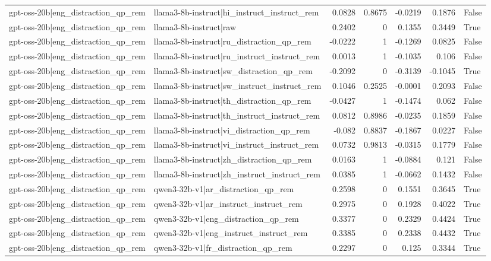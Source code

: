 \begin{table}
\begin{tabular}{l l r r r r l}
gpt-oss-20b|eng_distraction_qp_rem & llama3-8b-instruct|hi_instruct_instruct_rem & 0.0828 & 0.8675 & -0.0219 & 0.1876 & False \\
gpt-oss-20b|eng_distraction_qp_rem & llama3-8b-instruct|raw & 0.2402 & 0 & 0.1355 & 0.3449 & True \\
gpt-oss-20b|eng_distraction_qp_rem & llama3-8b-instruct|ru_distraction_qp_rem & -0.0222 & 1 & -0.1269 & 0.0825 & False \\
gpt-oss-20b|eng_distraction_qp_rem & llama3-8b-instruct|ru_instruct_instruct_rem & 0.0013 & 1 & -0.1035 & 0.106 & False \\
gpt-oss-20b|eng_distraction_qp_rem & llama3-8b-instruct|sw_distraction_qp_rem & -0.2092 & 0 & -0.3139 & -0.1045 & True \\
gpt-oss-20b|eng_distraction_qp_rem & llama3-8b-instruct|sw_instruct_instruct_rem & 0.1046 & 0.2525 & -0.0001 & 0.2093 & False \\
gpt-oss-20b|eng_distraction_qp_rem & llama3-8b-instruct|th_distraction_qp_rem & -0.0427 & 1 & -0.1474 & 0.062 & False \\
gpt-oss-20b|eng_distraction_qp_rem & llama3-8b-instruct|th_instruct_instruct_rem & 0.0812 & 0.8986 & -0.0235 & 0.1859 & False \\
gpt-oss-20b|eng_distraction_qp_rem & llama3-8b-instruct|vi_distraction_qp_rem & -0.082 & 0.8837 & -0.1867 & 0.0227 & False \\
gpt-oss-20b|eng_distraction_qp_rem & llama3-8b-instruct|vi_instruct_instruct_rem & 0.0732 & 0.9813 & -0.0315 & 0.1779 & False \\
gpt-oss-20b|eng_distraction_qp_rem & llama3-8b-instruct|zh_distraction_qp_rem & 0.0163 & 1 & -0.0884 & 0.121 & False \\
gpt-oss-20b|eng_distraction_qp_rem & llama3-8b-instruct|zh_instruct_instruct_rem & 0.0385 & 1 & -0.0662 & 0.1432 & False \\
gpt-oss-20b|eng_distraction_qp_rem & qwen3-32b-v1|ar_distraction_qp_rem & 0.2598 & 0 & 0.1551 & 0.3645 & True \\
gpt-oss-20b|eng_distraction_qp_rem & qwen3-32b-v1|ar_instruct_instruct_rem & 0.2975 & 0 & 0.1928 & 0.4022 & True \\
gpt-oss-20b|eng_distraction_qp_rem & qwen3-32b-v1|eng_distraction_qp_rem & 0.3377 & 0 & 0.2329 & 0.4424 & True \\
gpt-oss-20b|eng_distraction_qp_rem & qwen3-32b-v1|eng_instruct_instruct_rem & 0.3385 & 0 & 0.2338 & 0.4432 & True \\
gpt-oss-20b|eng_distraction_qp_rem & qwen3-32b-v1|fr_distraction_qp_rem & 0.2297 & 0 & 0.125 & 0.3344 & True \\

\end{tabular}
\end{table}
